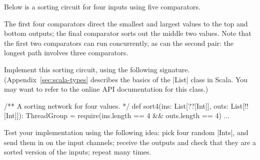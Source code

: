 \begin{question}
Below is a sorting circuit for four inputs using five comparators.
%
\begin{center}
\end{center}
%
The first four comparators direct the smallest and largest values to the top
and bottom outputs; the final comparator sorts out the middle two values.
Note that the first two comparators can run concurrently, as can the second
pair: the longest path involves  three comparators.

\begin{qpart}
\label{Q:sort4}
Implement this sorting circuit, using the following signature.
(Appendix~\ref{sec:scala-types} describes the basics of the |List| class in
Scala.  You may want to refer to the online API documentation for this class.)
%  
\begin{scala}
  /** A sorting network for four values. */
  def sort4(ins: List[??[Int]], outs: List[!![Int]]): ThreadGroup = {
    require(ins.length == 4 && outs.length == 4)
    ...
  }
\end{scala}
%
Test your implementation using the following idea: pick four random |Ints|,
and send them in on the input channels; receive the outputs and check that
they are a sorted version of the inputs; repeat many times.
\end{qpart}



\end{question}

